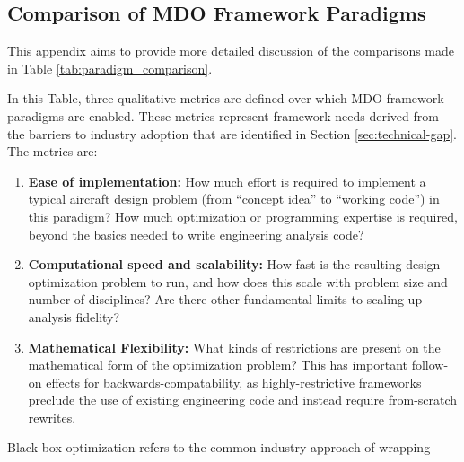 \documentclass[12pt,vi,oneside]{report}
\begin{document}
    \begin{appendices}
        \chapter{Comparison of MDO Framework Paradigms}
        \label{sec:paradigm_comparison}

        This appendix aims to provide more detailed discussion of the comparisons made in Table \ref{tab:paradigm_comparison}.

        In this Table, three qualitative metrics are defined over which MDO framework paradigms are enabled. These metrics represent framework needs derived from the barriers to industry adoption that are identified in Section \ref{sec:technical-gap}. The metrics are:

        \begin{enumerate}
            \item \textbf{Ease of implementation:} How much effort is required to implement a typical aircraft design problem (from ``concept idea'' to ``working code'') in this paradigm? How much optimization or programming expertise is required, beyond the basics needed to write engineering analysis code?
            \item \textbf{Computational speed and scalability:} How fast is the resulting design optimization problem to run, and how does this scale with problem size and number of disciplines? Are there other fundamental limits to scaling up analysis fidelity?
            \item \textbf{Mathematical Flexibility:} What kinds of restrictions are present on the mathematical form of the optimization problem? This has important follow-on effects for backwards-compatability, as highly-restrictive frameworks preclude the use of existing engineering code and instead require from-scratch rewrites.
        \end{enumerate}

        Black-box optimization refers to the common industry approach of wrapping %


    \end{appendices}
\end{document}
